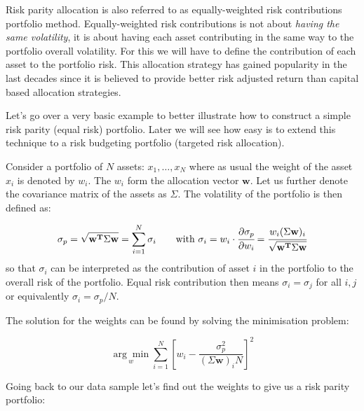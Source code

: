 Risk parity allocation is also referred to as equally-weighted risk
contributions portfolio method. Equally-weighted risk contributions is
not about \emph{having the same volatility}, it is about having each
asset contributing in the same way to the portfolio overall volatility.
For this we will have to define the contribution of each asset to the
portfolio risk. This allocation strategy has gained popularity in the
last decades since it is believed to provide better risk adjusted return
than capital based allocation strategies.

Let's go over a very basic example to better illustrate how to construct
a simple risk parity (equal risk) portfolio. Later we will see how easy
is to extend this technique to a risk budgeting portfolio (targeted risk
allocation).

Consider a portfolio of \(N\) assets: \(x_{1}, \ldots, x_N\) where as
usual the weight of the asset \(x_{i}\) is denoted by \(w_{i}\). The
\(w_{i}\) form the allocation vector \(\mathbf{w}\). Let us further
denote the covariance matrix of the assets as \(\Sigma\). The volatility
of the portfolio is then defined as:

\[ \sigma_p={\sqrt {\mathbf{w^T}\Sigma \mathbf{w}}} = \sum _{i=1}^{N}\sigma _{i}~~~~~~\textrm{with}~\sigma _{i} = w_{i}\cdot \cfrac{\partial\sigma_p}{\partial w_{i}}={\cfrac {w_{i}(\Sigma \mathbf{w})_{i}}{\sqrt {\mathbf{w^T}\Sigma \mathbf{w}}}}\]
so that \(\sigma _{i}\) can be interpreted as the contribution of asset
\(i\) in the portfolio to the overall risk of the portfolio.
Equal risk contribution then means \(\sigma _{i} =\sigma _{j}\) for all
\(i,j\) or equivalently \(\sigma _{i}=\sigma_p/N\).

The solution for the weights can be found by solving the minimisation
problem:

\[ \underset{w}{\arg \min } \sum _{i=1}^{N}\left[w_{i}-{\frac {\sigma_p^{2}}{(\Sigma \mathbf{w})_{i}N}}\right]^{2} \]

Going back to our data sample let's find out the weights to give us a
risk parity portfolio:

